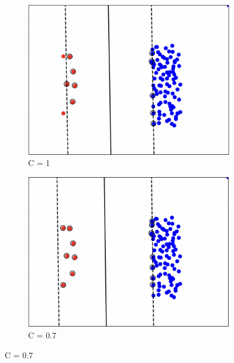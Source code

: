 \documentclass[a4paper,12pt]{article}
\begin{document}
\begin{figure}[H]
    \centering
    \begin{subfigure}[b]{0.45\textwidth}
        \centering
        \includegraphics[width=\textwidth]{Images/C=1.png}
        \caption{C = 1}
    \end{subfigure}
    \hfill
    \begin{subfigure}[b]{0.45\textwidth}
        \centering
        \includegraphics[width=\textwidth]{Images/C=0.7.png}
        \caption{C = 0.7}
    \end{subfigure}


\end{figure}
\end{document}
